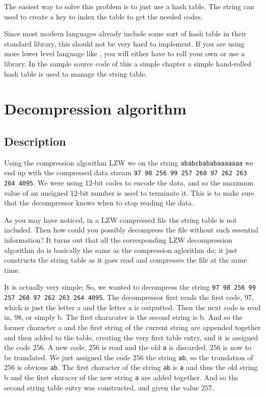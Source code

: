 \begin{refsection}
The easiest way to solve this problem is to just use a hash table. The
string can used to create a key to index the table to get the needed
codes.

Since most modern languages already include some sort of hash table in
their standard library, this should not be very hard to implement. If you
are using more lower level language like \C, you will either have
to roll your own or use a library. In the sample \C source code of
this a simple chapter a simple hand-rolled hash table is used to
manage the string table.

\section{Decompression algorithm}

\subsection{Description}

Using the compression algorithm LZW we on the string
\texttt{ababcbababaaaaaaa} we end up with the compressed data stream
\texttt{97 98 256 99 257 260 97 262 263 264 4095}. We were using
12-bit codes to encode the data, and so the maximum value of an
unsigned 12-bit number is used to terminate it. This is to make sure
that the decompressor knows when to stop reading the data.

As you may have noticed, in a LZW compressed file the string table is
not included. Then how could you possibly decompress the file without
such essential information? It turns out that all the corresponding
LZW decompression algorithm do is basically the same as the
compression aglorithm do; it just constructs the string table as it
goes read and compresses the file at the same time.

It is actually very simple; So, we wanted to decompress the string
\texttt{97 98 256 99 257 260 97 262 263 264 4095}. The decompressor
first reads the first code, $97$, which is just the letter a and the
letter a is outputted. Then the next code is read in, $98$, or simply
b. The first characater is the second string is b. And so the former
character a and the first string of the current string are appended
together and then added to the table, creating the very first table
entry,  and it is assigned the code $256$. A new code,
256 is read and the old \texttt{a} is discarded. $256$ is now to be
translated. We just assigned the code $256$ the string \texttt{ab}, so
the translation of $256$ is obvious \texttt{ab}. The first character
of the string \texttt{ab} is \texttt{a} and thus the old string b and
the first characer of the new string \texttt{a} are added
together. And so ths second string table entry was constructed, and
given the value $257$.


\end{refsection}

